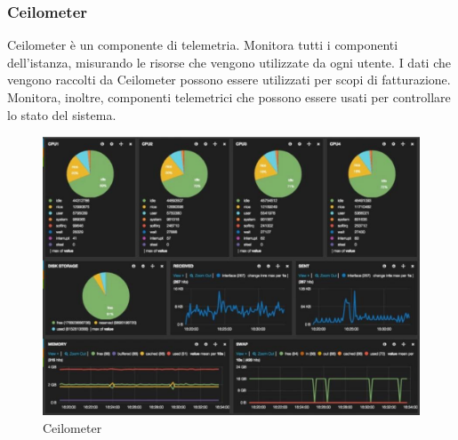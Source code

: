 \documentclass{article}
\begin{document}
\subsubsection{Ceilometer}
Ceilometer è un componente di telemetria. Monitora tutti i componenti dell'istanza, misurando le risorse che vengono utilizzate da ogni utente. I dati che vengono raccolti da Ceilometer possono essere utilizzati per scopi di fatturazione. Monitora, inoltre, componenti telemetrici che possono essere usati per controllare lo stato del sistema.
\begin{figure}[H]
    \centering
    \includegraphics[scale=0.4]{img/Celiometer.png}
    \caption{Ceilometer}
\end{figure}\noindent
\end{document}
